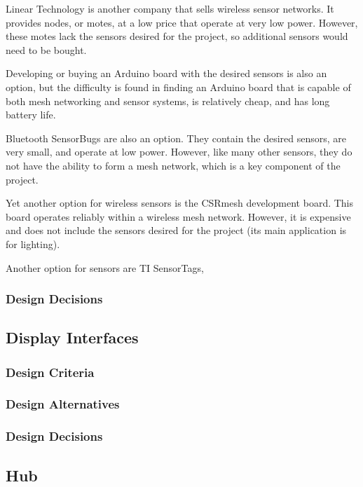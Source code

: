 \documentclass[ppfs.tex]{template/subfiles}
\begin{document}
Linear Technology is another company that sells wireless sensor networks. It provides nodes, or motes, at a low price that operate at very low power. However, these motes lack the sensors desired for the project, so additional sensors would need to be bought. \cite{6}

Developing or buying an Arduino board with the desired sensors is also an option, but the difficulty is found in finding an Arduino board that is capable of both mesh networking and sensor systems, is relatively cheap, and has long battery life. \cite{7} %

Bluetooth SensorBugs are also an option. They contain the desired sensors, are very small, and operate at low power. However, like many other sensors, they do not have the ability to form a mesh network, which is a key component of the project. \cite{8}

Yet another option for wireless sensors is the CSRmesh development board. This board operates reliably within a wireless mesh network. However, it is expensive and does not include the sensors desired for the project (its main application is for lighting). \cite{9}

Another option for sensors are TI SensorTags,

\subsubsection{Design Decisions}

\subsection{Display Interfaces}

\subsubsection{Design Criteria}

\subsubsection{Design Alternatives}

\subsubsection{Design Decisions}

\subsection{Hub}
\end{document}
